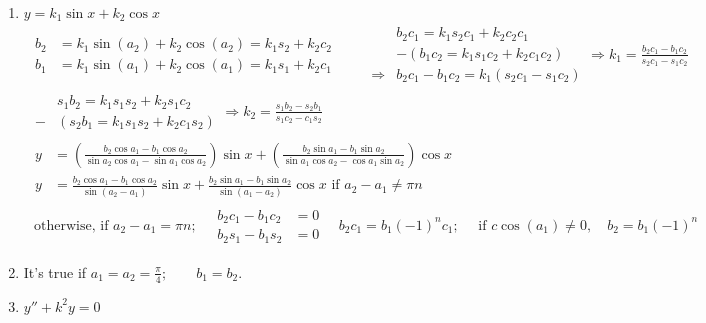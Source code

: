 \documentclass[twoside]{amsart}
\theoremstyle{plain}
\theoremstyle{definition}
\newcommand{\exercisehead}[1]
  {\smallskip
   \noindent{\small\bf Exercise #1.}}
\begin{document}
\exercisehead{19} \begin{enumerate}
\item $y = k_1 \sin{x} + k_2 \cos{x} $
\[
\begin{gathered}
  \begin{aligned}
    b_2 & = k_1 \sin{(a_2)} + k_2 \cos{ (a_2) } = k_1 s_2 + k_2 c_2 \\
    b_1 & = k_1 \sin{ (a_1) } + k_2 \cos{ (a_1) } = k_1 s_1 + k_2 c_1 
\end{aligned} \quad \quad 
\begin{aligned}
  & b_2 c_1 = k_1 s_2 c_1 + k_2 c_2 c_1 \\
  & -(b_1 c_2 = k_1 s_1 c_2 + k_2 c_1 c_2 ) \\ 
  \Longrightarrow & b_2 c_1 - b_1 c_2 = k_1 (s_2 c_1 - s_1 c_2 ) 
\end{aligned} \Longrightarrow k_1 = \frac{ b_2 c_1 - b_1 c_2 }{ s_2 c_1 - s_1 c_2 } \\
\begin{aligned}
  & s_1 b_2 = k_1 s_1 s_2 + k_2 s_1 c_2 \\
  - & (s_2 b_1 = k_1 s_1 s_2 + k_2 c_1 s_2 ) 
\end{aligned} \Longrightarrow k_2 = \frac{ s_1 b_2 - s_2 b_1 }{ s_1 c_2 - c_1 s_2 } \\
\begin{aligned}
  y & = \left( \frac{ b_2 \cos{a_1} - b_1 \cos{a_2} }{ \sin{a_2} \cos{a_1} - \sin{a_1} \cos{a_2} } \right) \sin{x} + \left( \frac{ b_2 \sin{a_1} - b_1 \sin{a_2}}{ \sin{a_1} \cos{a_2} - \cos{a_1} \sin{a_2} } \right) \cos{x} \\
  y & = \boxed{ \frac{ b_2 \cos{ a_1} - b_1 \cos{a_2} }{ \sin{ (a_2 - a_1 ) } } \sin{x} + \frac{ b_2 \sin{ a_1} - b_1 \sin{a_2} }{ \sin{(a_1 - a_2 ) } } \cos{x} } \text{ if $a_2 - a_1 \neq \pi n $ } 
\end{aligned} \\
\text{ otherwise, if $a_2 - a_1 = \pi n$}; \quad \begin{aligned} b_2 c_1 - b_1 c_2 & = 0 \\ b_2 s_1 - b_1 s_2 & = 0 \end{aligned} \quad b_2 c_1 = b_1 (-1)^n c_1 ; \quad \text{ if } c \cos{(a_1) } \neq 0 , \quad b_2 = b_1 (-1)^n 
\end{gathered}
\]
\item It's true if $a_1 = a_2 = \frac{\pi}{4}; \quad \quad b_1 = b_2$.  
\item $y'' + k^2 y = 0$
\[
\begin{gathered}
  \begin{aligned}

\end{aligned}
\end{gathered}\]
\end{enumerate}
\end{document}
